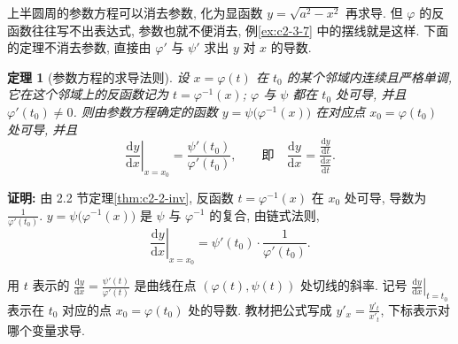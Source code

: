 \documentclass[UTF8,openany]{ctexbook}
\theoremstyle{chinesetextbook}
\newenvironment{cnproof}{\par\indent\textbf{证明:} \ignorespaces}{\par}
\newtheorem*{theoremsingle}{定理}
\newcommand{\dd}{\mathrm d}
\begin{document}
上半圆周的参数方程可以消去参数, 化为显函数 $y=\sqrt{a^2-x^2}$ 再求导. 但 $\varphi$ 的反函数往往写不出表达式, 参数也就不便消去, 例\ref{ex:c2-3-7} 中的摆线就是这样. 下面的定理不消去参数, 直接由 $\varphi'$ 与 $\psi'$ 求出 $y$ 对 $x$ 的导数.
\begin{theoremsingle}[参数方程的求导法则]
设 $x=\varphi(t)$ 在 $t_0$ 的某个邻域内连续且严格单调, 它在这个邻域上的反函数记为 $t=\varphi^{-1}(x)$; $\varphi$ 与 $\psi$ 都在 $t_0$ 处可导, 并且 $\varphi'(t_0)\ne0$. 则由参数方程确定的函数 $y=\psi\bigl(\varphi^{-1}(x)\bigr)$ 在对应点 $x_0=\varphi(t_0)$ 处可导, 并且
\[
\left.\frac{\dd y}{\dd x}\right|_{x=x_0}=\frac{\psi'(t_0)}{\varphi'(t_0)},\qquad\text{即}\quad\frac{\dd y}{\dd x}=\frac{\frac{\dd y}{\dd t}}{\frac{\dd x}{\dd t}}.
\]
\end{theoremsingle}
\begin{cnproof}
由 2.2 节定理\ref{thm:c2-2-inv}, 反函数 $t=\varphi^{-1}(x)$ 在 $x_0$ 处可导, 导数为 $\displaystyle\frac1{\varphi'(t_0)}$. $y=\psi\bigl(\varphi^{-1}(x)\bigr)$ 是 $\psi$ 与 $\varphi^{-1}$ 的复合, 由链式法则,
\[
\left.\frac{\dd y}{\dd x}\right|_{x=x_0}=\psi'(t_0)\cdot\frac1{\varphi'(t_0)}.
\]
\end{cnproof}
用 $t$ 表示的 $\displaystyle\frac{\dd y}{\dd x}=\frac{\psi'(t)}{\varphi'(t)}$ 是曲线在点 $(\varphi(t),\psi(t))$ 处切线的斜率. 记号 $\displaystyle\left.\frac{\dd y}{\dd x}\right|_{t=t_0}$ 表示在 $t_0$ 对应的点 $x_0=\varphi(t_0)$ 处的导数. 教材把公式写成 $\displaystyle y'_x=\frac{y'_t}{x'_t}$, 下标表示对哪个变量求导.
\end{document}
